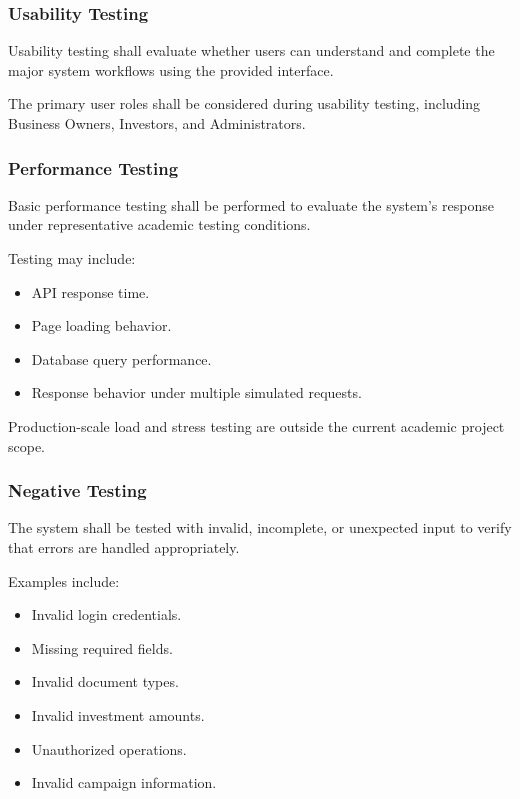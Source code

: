 \subsubsection{Usability Testing}

Usability testing shall evaluate whether users can understand and
complete the major system workflows using the provided interface.

The primary user roles shall be considered during usability testing,
including Business Owners, Investors, and Administrators.

\subsubsection{Performance Testing}

Basic performance testing shall be performed to evaluate the system's
response under representative academic testing conditions.

Testing may include:

\begin{itemize}
    \item API response time.
    \item Page loading behavior.
    \item Database query performance.
    \item Response behavior under multiple simulated requests.
\end{itemize}

Production-scale load and stress testing are outside the current
academic project scope.

\subsubsection{Negative Testing}

The system shall be tested with invalid, incomplete, or unexpected input
to verify that errors are handled appropriately.

Examples include:

\begin{itemize}
    \item Invalid login credentials.
    \item Missing required fields.
    \item Invalid document types.
    \item Invalid investment amounts.
    \item Unauthorized operations.
    \item Invalid campaign information.
\end{itemize}

